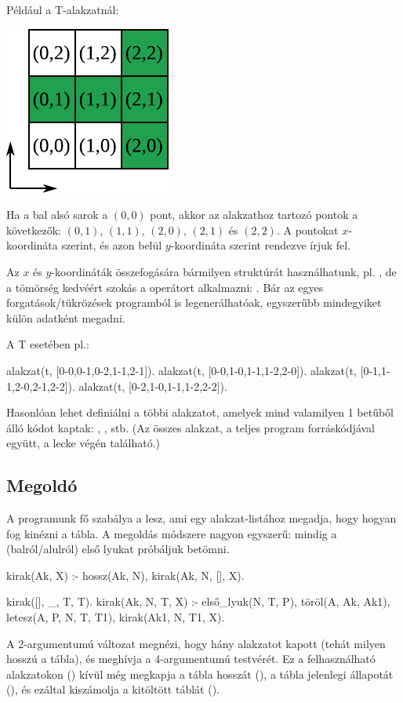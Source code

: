 Például a T-alakzatnál:
\begin{center}
\includegraphics[width=.3\textwidth]{images/pentomino.pdf}
\end{center}
Ha a bal alsó sarok a $(0,0)$ pont, akkor az
alakzathoz tartozó pontok a következők: $(0,1)$,
$(1,1)$, $(2,0)$, $(2,1)$ és $(2,2)$. A pontokat
$x$-koordináta szerint, és azon belül $y$-koordináta
szerint rendezve írjuk fel.

Az $x$ és $y$-koordináták összefogására bármilyen
struktúrát használhatunk, pl. , de a
tömörség kedvéért szokás a \pr{-} operátort
alkalmazni: . Bár az egyes
forgatások/tükrözések programból is legenerálhatóak,
egyszerűbb mindegyiket külön adatként megadni.

A T esetében pl.:
\begin{program}
alakzat(t, [0-0,0-1,0-2,1-1,2-1]).
alakzat(t, [0-0,1-0,1-1,1-2,2-0]).
alakzat(t, [0-1,1-1,2-0,2-1,2-2]).
alakzat(t, [0-2,1-0,1-1,1-2,2-2]).
\end{program}

Hasonlóan lehet definiálni a többi alakzatot,
amelyek mind valamilyen 1 betűből álló kódot kaptak:
, ,  stb. (Az összes alakzat, a
teljes program forráskódjával együtt, a lecke végén
található.)

\subsection*{Megoldó}
A programunk fő szabálya a  lesz, ami egy
alakzat-listához megadja, hogy hogyan fog kinézni a
tábla. A megoldás módszere nagyon egyszerű: mindig a
(balról/alulról) első lyukat próbáljuk betömni.

\begin{program}
kirak(Ak, X) :- hossz(Ak, N), kirak(Ak, N, [], X).

kirak([], _, T, T).
kirak(Ak, N, T, X) :-
    első_lyuk(N, T, P),
    töröl(A, Ak, Ak1),
    letesz(A, P, N, T, T1),
    kirak(Ak1, N, T1, X).
\end{program}
A 2-argumentumú változat megnézi, hogy hány
alakzatot kapott (tehát milyen hosszú a tábla), és
meghívja a 4-argumentumú testvérét. Ez a
felhasználható alakzatokon () kívül még
megkapja a tábla hosszát (), a tábla jelenlegi
állapotát (), és ezáltal kiszámolja a
kitöltött táblát ().


